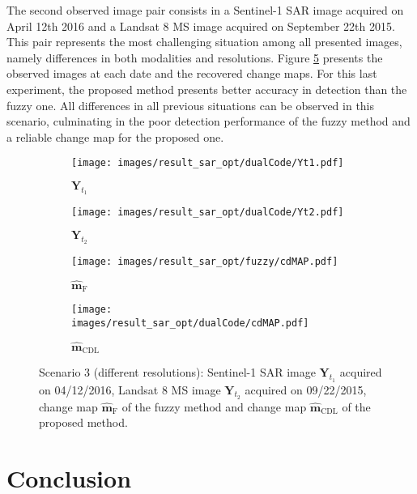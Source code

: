 \documentclass[review]{elsarticle}
\begin{document}
The second observed image pair consists in a Sentinel-1 SAR image acquired on April 12th 2016 and a Landsat 8 MS image acquired on September 22th 2015. This pair represents the most challenging situation among all presented images, namely differences in both modalities and resolutions. Figure \ref{fig:realS1S2_1} presents the observed images at each date and the recovered change maps. For this last experiment, the proposed method presents better accuracy in detection than the fuzzy one. All differences in all previous situations can be observed in this scenario, culminating in the poor detection performance of the fuzzy method and a reliable change map for the proposed one.

\begin{figure}[h!]
\centering
			\begin{subfigure}{\subfwidth}
					\centering
					\texttt{[image: images/result\_sar\_opt/dualCode/Yt1.pdf]}
					\caption{$\mathbf{Y}_{t_1}$}
					\label{fig:s1s2Yt1_1}
			\end{subfigure}
			\begin{subfigure}{\subfwidth}
					\centering
					\texttt{[image: images/result\_sar\_opt/dualCode/Yt2.pdf]}
					\caption{$\mathbf{Y}_{t_2}$}
					\label{fig:s1s2Yt2_1}
			\end{subfigure}
            \begin{subfigure}{\subfwidth}
					\centering
					\texttt{[image: images/result\_sar\_opt/fuzzy/cdMAP.pdf]}
					\caption{$\hat{\mathbf{m}}_{\mathrm{F}}$}
					\label{fig:s1s2FMAP_1}
			\end{subfigure}
			\begin{subfigure}{\subfwidth}
					\centering
					\texttt{[image: images/result\_sar\_opt/dualCode/cdMAP.pdf]}
					\caption{$\hat{\mathbf{m}}_{\mathrm{CDL}}$}
					\label{fig:s1s2DCMAP_1}
			\end{subfigure}
\caption{Scenario 3 (different resolutions): \protect{}  Sentinel-1 SAR image $\mathbf{Y}_{t_1}$ acquired on 04/12/2016, \protect{}  Landsat 8 MS image $\mathbf{Y}_{t_2}$ acquired on 09/22/2015, \protect{} change map $\hat{\mathbf{m}}_{\mathrm{F}}$ of the fuzzy method and \protect{} change map $\hat{\mathbf{m}}_{\mathrm{CDL}}$ of the proposed method.}%
	\label{fig:realS1S2_1}%
\end{figure}

\section{Conclusion}
\label{sec:conclusion}
\end{document}
